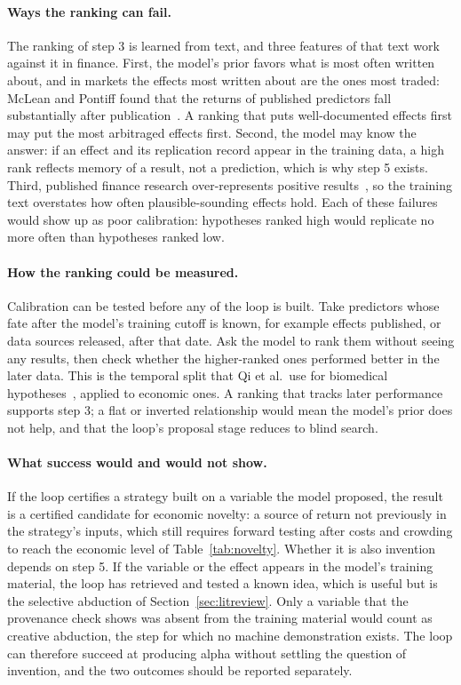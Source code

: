 \documentclass[11pt]{article}
\begin{document}
\paragraph{Ways the ranking can fail.} The ranking of step 3 is learned from text, and three features of
that text work against it in finance. First, the model's prior favors what is most often written about,
and in markets the effects most written about are the ones most traded: McLean and Pontiff found that the
returns of published predictors fall substantially after publication~\cite{mcleanpontiff}. A ranking that
puts well-documented effects first may put the most arbitraged effects first. Second, the model may know
the answer: if an effect and its replication record appear in the training data, a high rank reflects
memory of a result, not a prediction, which is why step 5 exists. Third, published finance research
over-represents positive results~\cite{harvey}, so the training text overstates how often plausible-sounding effects
hold. Each of these failures would show up as poor calibration: hypotheses ranked high would replicate no
more often than hypotheses ranked low.

\paragraph{How the ranking could be measured.} Calibration can be tested before any of the loop is built.
Take predictors whose fate after the model's training cutoff is known, for example effects published, or
data sources released, after that date. Ask the model to rank them without seeing any results, then check
whether the higher-ranked ones performed better in the later data. This is the temporal split that Qi et
al.\ use for biomedical hypotheses~\cite{qi2023}, applied to economic ones. A ranking that tracks later
performance supports step 3; a flat or inverted relationship would mean the model's prior does not help,
and that the loop's proposal stage reduces to blind search.

\paragraph{What success would and would not show.} If the loop certifies a strategy built on a variable
the model proposed, the result is a certified candidate for economic novelty: a source of return not
previously in the strategy's inputs, which still requires forward testing after costs and crowding to
reach the economic level of Table~\ref{tab:novelty}. Whether it is also invention depends on step 5. If the
variable or the effect appears in the model's training material, the loop has retrieved and tested a
known idea, which is useful but is the selective abduction of Section~\ref{sec:litreview}. Only a variable
that the provenance check shows was absent from the training material would count as creative abduction,
the step for which no machine demonstration exists. The loop can therefore succeed at producing alpha
without settling the question of invention, and the two outcomes should be reported separately.
\end{document}
